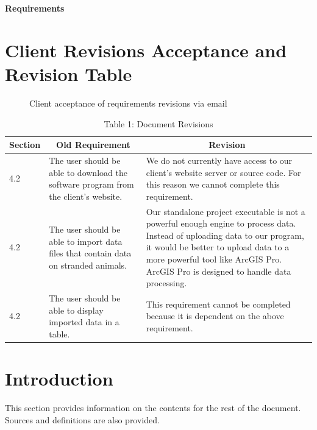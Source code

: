 \documentclass[onecolumn, draftclsnofoot,10pt, compsoc]{IEEEtran}
\begin{document}
\begin{singlespace}
\textbf{{\Large Requirements}}
\section{Client Revisions Acceptance and Revision Table}
\begin{figure}[H]
    \caption{Client acceptance of requirements revisions via email}
    \label{fig:RevisionAcceptance}
    \end{figure}
\begin{table}[H]
\begin{center}
 \begin{tabular}{ |p{}|p{}|p{}|} 
 \hline
 \multicolumn{1}{|c|}{\textbf{Section}} 
 & 
\multicolumn{1}{|c|}{\textbf{Old Requirement}}  & 
\multicolumn{1}{|c|}{\textbf{Revision}}\\
 \hline
 
4.2 & The user should be able to download the software program from the client's website. &  We do not currently have access to our client's website server or source code. For this reason we cannot complete this requirement. \\
 \hline
 
 4.2 & The user should be able to import data files that contain data on stranded animals. & Our standalone project executable is not a powerful enough engine to process data. Instead of uploading data to our program, it would be better to upload data to a more powerful tool like ArcGIS Pro. ArcGIS Pro is designed to handle data processing.\\
 \hline
 
  4.2 & The user should be able to display imported data in a table. & This requirement cannot be completed because it is dependent on the above requirement.\\
 \hline


\end{tabular}
\caption{Table 1: Document Revisions}
\label{table:1}
\end{center}
\end{table}


\section{Introduction}
This section provides information on the contents for the rest of the document.  Sources and definitions are also provided.

\end{singlespace}
\end{document}
